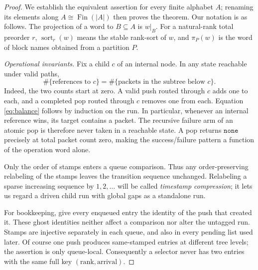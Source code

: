 \documentclass[11pt]{article}
\theoremstyle{definition}
\newcommand{\Fin}{\operatorname{Fin}}
\newcommand{\sort}{\operatorname{sort}}
\newcommand{\None}{\texttt{none}}
\begin{document}
\begin{proof}
We establish the equivalent assertion for every finite alphabet \(A\);
renaming its elements along \(A\cong\Fin(|A|)\) then proves the theorem.
Our notation is as follows.  The projection of a word to \(B\subseteq A\)
is \(w|_B\).  For a natural-rank total preorder \(r\),
\(\sort_r(w)\) means the stable rank-sort of \(w\), and \(\pi_P(w)\) is the
word of block names obtained from a partition \(P\).

\medskip
\noindent\textit{Operational invariants.}
Fix a child \(c\) of an internal node.  In any state reachable under valid
paths,
\begin{equation}
 \#\{\text{references to }c\}
 =
 \#\{\text{packets in the subtree below }c\}.
 \tag{1}\label{eq:balance}
\end{equation}
Indeed, the two counts start at zero.  A valid push routed through \(c\)
adds one to each, and a completed pop routed through \(c\) removes one from
each.  Equation \eqref{eq:balance} follows by induction on the run.  In
particular, whenever an internal reference wins, its target contains a
packet.  The recursive failure arm of an atomic pop is therefore never
taken in a reachable state.  A pop returns \(\None\) precisely at total
packet count zero, making the success/failure pattern a function of the
operation word alone.

Only the order of stamps enters a queue comparison.  Thus any
order-preserving relabeling of the stamps leaves the transition sequence
unchanged.  Relabeling a sparse increasing sequence by \(1,2,\ldots\) will
be called \emph{timestamp compression}; it lets us regard a driven child
run with global gaps as a standalone run.

For bookkeeping, give every enqueued entry the identity of the push that
created it.  These ghost identities neither affect a comparison nor alter
the untagged run.  Stamps are injective separately in each queue, and also
in every pending list used later.  Of course one push produces same-stamped
entries at different tree levels; the assertion is only queue-local.
Consequently a selector never has two entries with the same full key
\((\text{rank},\text{arrival})\).


\end{proof}
\end{document}
